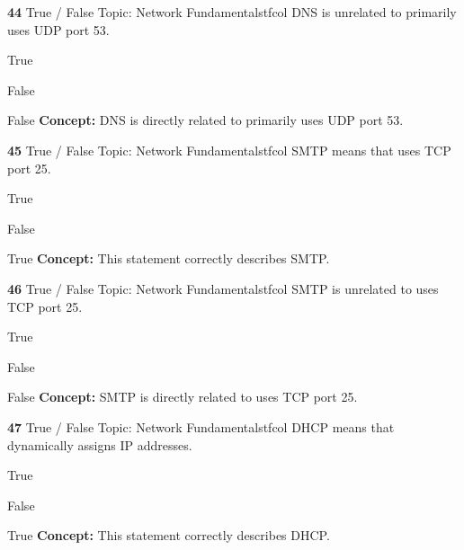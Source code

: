 \documentclass[10pt,a4paper]{article}
\begin{document}
\begin{qcard}{\color{white}\textbf{44} \hfill \small True / False \textbar{} Topic: Network Fundamentals}{tfcol}
DNS is unrelated to primarily uses UDP port 53.

\begin{qoptions}
\item True
\item False
\end{qoptions}
\begin{explainbox}{False}
\textbf{Concept:} DNS is directly related to primarily uses UDP port 53.
\end{explainbox}
\end{qcard}

\begin{qcard}{\color{white}\textbf{45} \hfill \small True / False \textbar{} Topic: Network Fundamentals}{tfcol}
SMTP means that uses TCP port 25.

\begin{qoptions}
\item True
\item False
\end{qoptions}
\begin{explainbox}{True}
\textbf{Concept:} This statement correctly describes SMTP.
\end{explainbox}
\end{qcard}

\begin{qcard}{\color{white}\textbf{46} \hfill \small True / False \textbar{} Topic: Network Fundamentals}{tfcol}
SMTP is unrelated to uses TCP port 25.

\begin{qoptions}
\item True
\item False
\end{qoptions}
\begin{explainbox}{False}
\textbf{Concept:} SMTP is directly related to uses TCP port 25.
\end{explainbox}
\end{qcard}

\begin{qcard}{\color{white}\textbf{47} \hfill \small True / False \textbar{} Topic: Network Fundamentals}{tfcol}
DHCP means that dynamically assigns IP addresses.

\begin{qoptions}
\item True
\item False
\end{qoptions}
\begin{explainbox}{True}
\textbf{Concept:} This statement correctly describes DHCP.
\end{explainbox}
\end{qcard}
\end{document}
